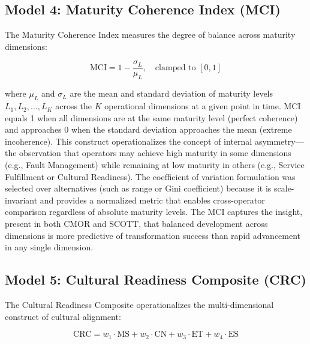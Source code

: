 \documentclass[12pt,a4paper]{article}
\begin{document}
\subsection{Model 4: Maturity Coherence Index (MCI)}

The Maturity Coherence Index measures the degree of balance across maturity dimensions:

\begin{equation}
\text{MCI} = 1 - \frac{\sigma_L}{\mu_L}, \quad \text{clamped to } [0, 1]
\label{eq:mci}
\end{equation}

\noindent where $\mu_L$ and $\sigma_L$ are the mean and standard deviation of maturity levels $L_1, L_2, \ldots, L_K$ across the $K$ operational dimensions at a given point in time. MCI equals 1 when all dimensions are at the same maturity level (perfect coherence) and approaches 0 when the standard deviation approaches the mean (extreme incoherence). This construct operationalizes the concept of internal asymmetry---the observation that operators may achieve high maturity in some dimensions (e.g., Fault Management) while remaining at low maturity in others (e.g., Service Fulfillment or Cultural Readiness). The coefficient of variation formulation was selected over alternatives (such as range or Gini coefficient) because it is scale-invariant and provides a normalized metric that enables cross-operator comparison regardless of absolute maturity levels. The MCI captures the insight, present in both CMOR and SCOTT, that balanced development across dimensions is more predictive of transformation success than rapid advancement in any single dimension.

\subsection{Model 5: Cultural Readiness Composite (CRC)}

The Cultural Readiness Composite operationalizes the multi-dimensional construct of cultural alignment:

\begin{equation}
\text{CRC} = w_1 \cdot \text{MS} + w_2 \cdot \text{CN} + w_3 \cdot \text{ET} + w_4 \cdot \text{ES}
\label{eq:crc}
\end{equation}
\end{document}
